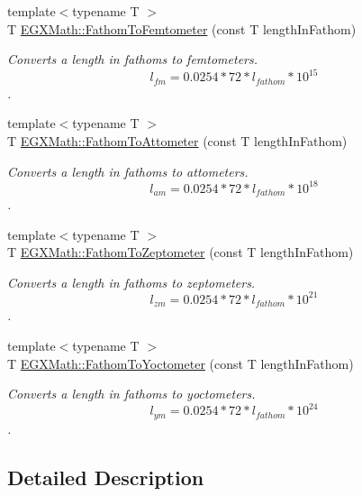 \begin{DoxyCompactItemize}
{\footnotesize template$<$typename T $>$ }\\T \mbox{\hyperlink{group___e_g_x_math-_conversions-_length_conversions-_nautical-_fathom-_s_i_ga507bda2a437e3cccfda56c2e48ad7262}{E\+G\+X\+Math\+::\+Fathom\+To\+Femtometer}} (const T length\+In\+Fathom)
\begin{DoxyCompactList}\small\item\em Converts a length in fathoms to femtometers. \[ l_{fm}=0.0254 * 72 * l_{fathom} * 10^{15} \]. \end{DoxyCompactList}\item 
{\footnotesize template$<$typename T $>$ }\\T \mbox{\hyperlink{group___e_g_x_math-_conversions-_length_conversions-_nautical-_fathom-_s_i_ga9cc357e26a4f582c83487932d82e09cb}{E\+G\+X\+Math\+::\+Fathom\+To\+Attometer}} (const T length\+In\+Fathom)
\begin{DoxyCompactList}\small\item\em Converts a length in fathoms to attometers. \[ l_{am}=0.0254 * 72 * l_{fathom} * 10^{18} \]. \end{DoxyCompactList}\item 
{\footnotesize template$<$typename T $>$ }\\T \mbox{\hyperlink{group___e_g_x_math-_conversions-_length_conversions-_nautical-_fathom-_s_i_ga2ce11498768b6c37b65bce7b6915d153}{E\+G\+X\+Math\+::\+Fathom\+To\+Zeptometer}} (const T length\+In\+Fathom)
\begin{DoxyCompactList}\small\item\em Converts a length in fathoms to zeptometers. \[ l_{zm}=0.0254 * 72 * l_{fathom} * 10^{21} \]. \end{DoxyCompactList}\item 
{\footnotesize template$<$typename T $>$ }\\T \mbox{\hyperlink{group___e_g_x_math-_conversions-_length_conversions-_nautical-_fathom-_s_i_ga0b22b9db2c224dadfd62934797f14090}{E\+G\+X\+Math\+::\+Fathom\+To\+Yoctometer}} (const T length\+In\+Fathom)
\begin{DoxyCompactList}\small\item\em Converts a length in fathoms to yoctometers. \[ l_{ym}=0.0254 * 72 * l_{fathom} * 10^{24} \]. \end{DoxyCompactList}\end{DoxyCompactItemize}


\subsection{Detailed Description}


